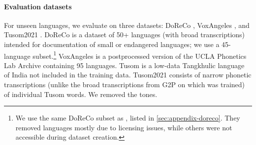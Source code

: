 \paragraph{Evaluation datasets}
For unseen languages, we evaluate on three datasets: DoReCo \cite{paschen2020doreco}, VoxAngeles \cite{chodroff2024voxangeles}, and Tusom2021 \cite{mortensen2021tusom2021}.
DoReCo is a dataset of 50+ languages (with broad transcriptions) intended for documentation of small or endangered languages; we use a 45-language subset.\footnote{
We use the same DoReCo subset as \citet{zhu-etal-2025-zipa,zhu-etal-2024-taste}, listed in \autoref{sec:appendix-doreco}. They removed languages mostly due to licensing issues, while others were not accessible during dataset creation.
}
VoxAngeles \citep{chodroff2024voxangeles} is a postprocessed version of the UCLA Phonetics Lab Archive \citep{ucla2009} containing 95 languages.
Tusom is a low-data Tangkhulic language of India not included in the training data. Tusom2021 \citep{mortensen2021tusom2021} consists of narrow phonetic transcriptions (unlike the broad transcriptions from G2P on which \POWSM was trained) of individual Tusom words.
We removed the tones.

